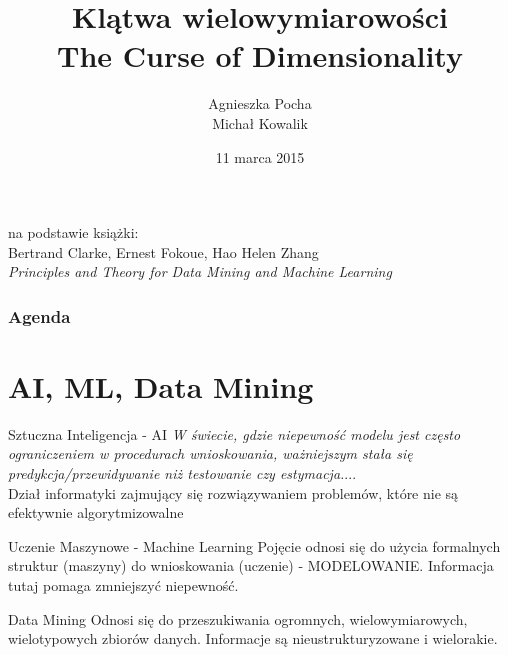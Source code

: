 \documentclass[a4paper]{beamer}
\author{Agnieszka Pocha \\ Michał Kowalik}
\title{Klątwa wielowymiarowości \\ The Curse of Dimensionality}
\date{11 marca 2015}
\begin{document}
\begin{frame}
\titlepage
{\footnotesize
na podstawie książki: \\
Bertrand Clarke, Ernest Fokoue, Hao Helen Zhang \\
}
\textit{Principles and Theory for Data Mining and Machine Learning}
\end{frame}


\begin{frame}
\frametitle{Agenda}
\tableofcontents
\end{frame}

\section{AI, ML, Data Mining}
\begin{frame}
\begin{block}{Sztuczna Inteligencja - AI}
\textit{W świecie, gdzie niepewność modelu jest często ograniczeniem w procedurach wnioskowania, ważniejszym stała się predykcja/przewidywanie niż testowanie czy estymacja.}... \\
Dział informatyki zajmujący się rozwiązywaniem problemów, które nie są efektywnie algorytmizowalne
\end{block}

\begin{block}{Uczenie Maszynowe - Machine Learning}
Pojęcie odnosi się do użycia formalnych struktur (maszyny) do wnioskowania (uczenie) - MODELOWANIE. Informacja tutaj pomaga zmniejszyć niepewność.
\end{block}

\begin{block}{Data Mining}
Odnosi się do przeszukiwania ogromnych, wielowymiarowych, wielotypowych zbiorów danych. Informacje są nieustrukturyzowane i wielorakie.
\end{block}
\end{frame}
\end{document}

